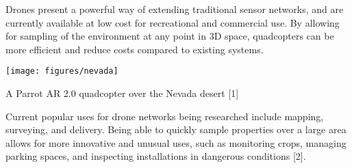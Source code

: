 \documentclass[landscape,a0paper,fontscale=0.285]{baposter} %
\begin{document}
\begin{poster}
{Drones present a powerful way of extending traditional sensor networks, and are currently available at low cost for recreational and commercial use. By allowing for sampling of the environment at any point in 3D space, quadcopters can be more efficient and reduce costs compared to existing systems.

\begin{center}
\texttt{[image: figures/nevada]}

\tiny{A Parrot AR 2.0 quadcopter over the Nevada desert [1]}
\end{center}

Current popular uses for drone networks being researched include mapping, surveying, and delivery. Being able to quickly sample properties over a large area allows for more innovative and unusual uses, such as monitoring crops, managing parking spaces, and inspecting installations in dangerous conditions [2].
}


\end{poster}
\end{document}
